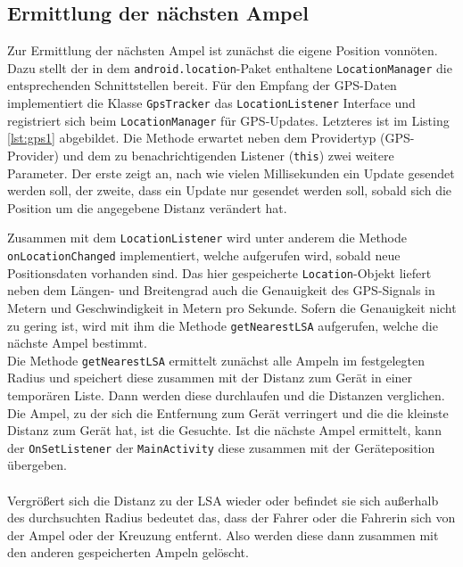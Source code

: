 \subsection{Ermittlung der nächsten Ampel}
Zur Ermittlung der nächsten Ampel ist zunächst die eigene Position vonnöten. Dazu stellt der in dem \texttt{android.location}-Paket enthaltene \texttt{LocationManager} die entsprechenden Schnittstellen bereit. Für den Empfang der \gls{GPS}-Daten implementiert die Klasse \texttt{GpsTracker} das \texttt{LocationListener} Interface und registriert sich beim \texttt{LocationManager} für \gls{GPS}-Updates.
Letzteres ist im Listing \ref{lst:gps1} abgebildet. Die Methode erwartet neben dem Providertyp (\gls{GPS}-Provider) und dem zu benachrichtigenden Listener (\texttt{this}) zwei weitere Parameter. Der erste zeigt an, nach wie vielen Millisekunden ein Update gesendet werden soll, der zweite, dass ein Update nur gesendet werden soll, sobald sich die Position um die angegebene Distanz verändert hat.
\begin{center}
\grayRule

\grayRule
\end{center}
Zusammen mit dem \texttt{LocationListener} wird unter anderem die Methode \texttt{onLocationChanged} implementiert, welche aufgerufen wird, sobald neue Positionsdaten vorhanden sind. Das hier gespeicherte \texttt{Location}-Objekt liefert neben dem Längen- und Breitengrad auch die Genauigkeit des \gls{GPS}-Signals in Metern und Geschwindigkeit in Metern pro Sekunde. Sofern die Genauigkeit nicht zu gering ist, wird mit ihm die Methode \texttt{getNearestLSA} aufgerufen, welche die nächste Ampel bestimmt.\\
Die Methode \texttt{getNearestLSA} ermittelt zunächst alle Ampeln im festgelegten Radius und speichert diese zusammen mit der Distanz zum Gerät in einer temporären Liste. Dann werden diese durchlaufen und die Distanzen verglichen. Die Ampel, zu der sich die Entfernung zum Gerät verringert und die die kleinste Distanz zum Gerät hat, ist die Gesuchte. Ist die nächste Ampel ermittelt, kann der \texttt{OnSetListener} der \texttt{MainActivity} diese zusammen mit der Geräteposition übergeben. \\\\
Vergrößert sich die Distanz zu der \gls{LSA} wieder oder befindet sie sich außerhalb des durchsuchten Radius bedeutet das, dass der Fahrer oder die Fahrerin sich von der Ampel oder der Kreuzung entfernt. Also werden diese dann zusammen mit den anderen gespeicherten Ampeln gelöscht.\\ 
\begin{center}
\grayRule

\grayRule
\end{center}
%
%
